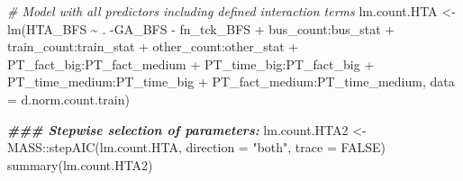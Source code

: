 \documentclass[
]{article}
\newenvironment{Shaded}{\begin{snugshade}}{\end{snugshade}}
\newcommand{\AttributeTok}[1]{\textcolor[rgb]{0.77,0.63,0.00}{#1}}
\newcommand{\CommentTok}[1]{\textcolor[rgb]{0.56,0.35,0.01}{\textit{#1}}}
\newcommand{\ConstantTok}[1]{\textcolor[rgb]{0.00,0.00,0.00}{#1}}
\newcommand{\DocumentationTok}[1]{\textcolor[rgb]{0.56,0.35,0.01}{\textbf{\textit{#1}}}}
\newcommand{\FunctionTok}[1]{\textcolor[rgb]{0.00,0.00,0.00}{#1}}
\newcommand{\NormalTok}[1]{#1}
\newcommand{\OtherTok}[1]{\textcolor[rgb]{0.56,0.35,0.01}{#1}}
\newcommand{\SpecialCharTok}[1]{\textcolor[rgb]{0.00,0.00,0.00}{#1}}
\newcommand{\StringTok}[1]{\textcolor[rgb]{0.31,0.60,0.02}{#1}}
\begin{document}
\begin{Shaded}
\begin{Highlighting}[]
\CommentTok{\# Model with all predictors including defined interaction terms}
\NormalTok{lm.count.HTA }\OtherTok{\textless{}{-}} \FunctionTok{lm}\NormalTok{(HTA\_BFS }\SpecialCharTok{\textasciitilde{}}\NormalTok{ . }\SpecialCharTok{{-}}\NormalTok{GA\_BFS }\SpecialCharTok{{-}}\NormalTok{ fn\_tck\_BFS }
                    \SpecialCharTok{+}\NormalTok{ bus\_count}\SpecialCharTok{:}\NormalTok{bus\_stat}
                    \SpecialCharTok{+}\NormalTok{ train\_count}\SpecialCharTok{:}\NormalTok{train\_stat}
                    \SpecialCharTok{+}\NormalTok{ other\_count}\SpecialCharTok{:}\NormalTok{other\_stat}
                    \SpecialCharTok{+}\NormalTok{ PT\_fact\_big}\SpecialCharTok{:}\NormalTok{PT\_fact\_medium}
                    \SpecialCharTok{+}\NormalTok{ PT\_time\_big}\SpecialCharTok{:}\NormalTok{PT\_fact\_big}
                    \SpecialCharTok{+}\NormalTok{ PT\_time\_medium}\SpecialCharTok{:}\NormalTok{PT\_time\_big}
                    \SpecialCharTok{+}\NormalTok{ PT\_fact\_medium}\SpecialCharTok{:}\NormalTok{PT\_time\_medium,}
                  \AttributeTok{data =}\NormalTok{ d.norm.count.train) }


\DocumentationTok{\#\#\# Stepwise selection of parameters:}
\NormalTok{lm.count.HTA2 }\OtherTok{\textless{}{-}}\NormalTok{ MASS}\SpecialCharTok{::}\FunctionTok{stepAIC}\NormalTok{(lm.count.HTA, }\AttributeTok{direction =} \StringTok{"both"}\NormalTok{, }\AttributeTok{trace =} \ConstantTok{FALSE}\NormalTok{)}
\FunctionTok{summary}\NormalTok{(lm.count.HTA2)}
\end{Highlighting}
\end{Shaded}
\end{document}
